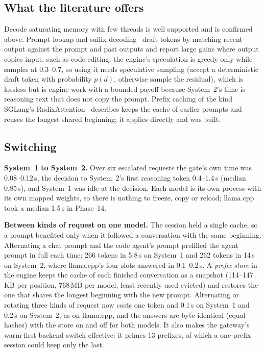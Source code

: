 \subsection{What the literature offers}

Decode saturating memory with few threads is well supported and is confirmed above. Prompt-lookup and suffix decoding~\cite{oliaro2024suffixdecoding}
draft tokens by matching recent output against the prompt and past outputs and report large gains where output copies input, such as code editing; the engine's
speculation is greedy-only while \Sys{} samples at 0.3--0.7, so using it needs speculative sampling (accept a deterministic draft token with probability
$p(d)$, otherwise sample the residual), which is lossless but is engine work with a bounded payoff because System~2's time is reasoning text that does not copy
the prompt. Prefix caching of the kind SGLang's RadixAttention~\cite{zheng2023sglang} describes keeps the cache of earlier prompts and reuses the longest shared
beginning; it applies directly and was built.

\subsection{Switching}

\textbf{System~1 to System~2.} Over six escalated requests the gate's own time was 0.08--0.12\,s, the decision to System~2's first reasoning token 0.4--1.4\,s
(median 0.85\,s), and System~1 was idle at the decision. Each model is its own process with its own mapped weights, so there is nothing to freeze, copy or reload;
llama.cpp took a median 1.5\,s in Phase~14.

\textbf{Between kinds of request on one model.} The session held a single cache, so a prompt benefited only when it followed a conversation with the same
beginning. Alternating a chat prompt and the code agent's prompt prefilled the agent prompt in full each time: 266 tokens in 5.8\,s on System~1 and 262 tokens in
14\,s on System~2, where llama.cpp's four slots answered in 0.1--0.2\,s. A \emph{prefix store} in the engine keeps the cache of each finished conversation as a
snapshot (114--147\,KB per position, 768\,MB per model, least recently used evicted) and restores the one that shares the longest beginning with the new prompt.
Alternating or rotating three kinds of request now costs one token and 0.1\,s on System~1 and 0.2\,s on System~2, as on llama.cpp, and the answers are
byte-identical (equal hashes) with the store on and off for both models. It also makes the gateway's warm-first backend switch effective: it primes 13 prefixes, of which a
one-prefix session could keep only the last.

